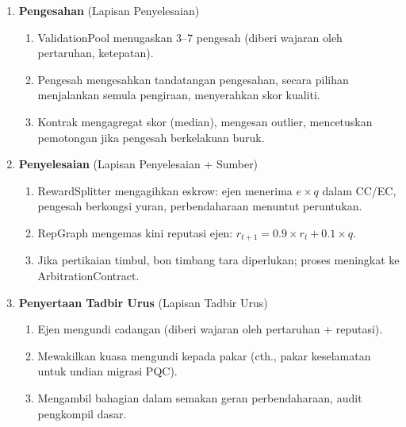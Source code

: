 \documentclass[11pt]{article}
\begin{document}
\begin{enumerate}
\begin{enumerate}[label=\alph*.]
      \item TEE menjana laporan pengesahan: hash pengukuran (membuktikan integriti kod), hash input/output, cap masa, penggunaan tenaga.
      \item Ejen menandatangani hasil dan pengesahan, mengira hash kandungan, menyerahkan melalui \texttt{submitWork()}.
    \end{enumerate}
  \item \textbf{Pengesahan} (Lapisan Penyelesaian)
    \begin{enumerate}[label=\alph*.]
      \item ValidationPool menugaskan 3--7 pengesah (diberi wajaran oleh pertaruhan, ketepatan).
      \item Pengesah mengesahkan tandatangan pengesahan, secara pilihan menjalankan semula pengiraan, menyerahkan skor kualiti.
      \item Kontrak mengagregat skor (median), mengesan outlier, mencetuskan pemotongan jika pengesah berkelakuan buruk.
    \end{enumerate}
  \item \textbf{Penyelesaian} (Lapisan Penyelesaian + Sumber)
    \begin{enumerate}[label=\alph*.]
      \item RewardSplitter mengagihkan eskrow: ejen menerima $e \times q$ dalam CC/EC, pengesah berkongsi yuran, perbendaharaan menuntut peruntukan.
      \item RepGraph mengemas kini reputasi ejen: $r_{t+1} = 0.9 \times r_t + 0.1 \times q$.
      \item Jika pertikaian timbul, bon timbang tara diperlukan; proses meningkat ke ArbitrationContract.
    \end{enumerate}
  \item \textbf{Penyertaan Tadbir Urus} (Lapisan Tadbir Urus)
    \begin{enumerate}[label=\alph*.]
      \item Ejen mengundi cadangan (diberi wajaran oleh pertaruhan + reputasi).
      \item Mewakilkan kuasa mengundi kepada pakar (cth., pakar keselamatan untuk undian migrasi PQC).
      \item Mengambil bahagian dalam semakan geran perbendaharaan, audit pengkompil dasar.
    \end{enumerate}
\end{enumerate}
\end{document}
